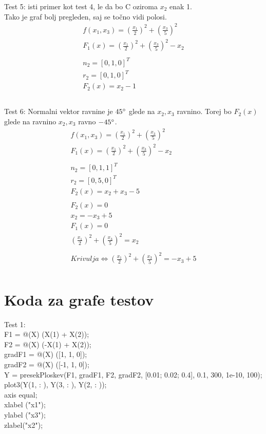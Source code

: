 \documentclass[12pt, letterpaper, twoside]{article}    %
\begin{document}
$$$$
$$$$

Test 5: isti primer kot test 4, le da bo C oziroma $x_2$ enak 1. \\
Tako je graf bolj pregleden, saj se točno vidi polosi.
\begin{equation}
\begin{split}
f(x_1, x_3) = (\frac{x_1}{2})^2 + (\frac{x_3}{5})^2 \\
F_1(x) = (\frac{x_1}{2})^2 + (\frac{x_3}{5})^2 - x_2 \\
\\
n_2 = [0, 1, 0]^T \\
r_2 = [0, 1, 0]^T \\
F_2(x) = x_2 - 1
\end{split}
\end{equation}

$$$$
$$$$

Test 6: Normalni vektor ravnine je $45\degree$ glede na $x_2, x_3$ ravnino.
Torej bo $F_2(x)$ glede na ravnino $x_2, x_3$ ravno $-45\degree$.
\begin{equation}
\begin{split}
f(x_1, x_3) = (\frac{x_1}{2})^2 + (\frac{x_3}{5})^2 \\
F_1(x) = (\frac{x_1}{2})^2 + (\frac{x_3}{5})^2 - x_2 \\
\\
n_2 = [0, 1, 1]^T \\
r_2 = [0, 5, 0]^T \\
F_2(x) = x_2 + x_3 - 5 \\
\\
F_2(x) = 0 \\
x_2 = - x_3 + 5 \\
F_1(x) = 0 \\
(\frac{x_1}{2})^2 + (\frac{x_3}{5})^2 = x_2 \\ 
\\
Krivulja \Leftrightarrow (\frac{x_1}{2})^2 + (\frac{x_3}{5})^2 = - x_3 + 5 \\
\end{split}
\end{equation}
$$$$

\newpage

\section{Koda za grafe testov}
Test 1: \\
F1 = @(X) (X(1) + X(2)); \\
F2 = @(X) (-X(1) + X(2)); \\
gradF1 = @(X) ([1, 1, 0]); \\
gradF2 = @(X) ([-1, 1, 0]); \\
Y = presekPloskev(F1, gradF1, F2, gradF2, [0.01; 0.02; 0.4], 0.1, 300, 1e-10, 100); \\
plot3(Y(1, : ), Y(3, : ), Y(2, : )); \\
axis equal; \\
xlabel ("x1"); \\
ylabel ("x3"); \\
zlabel("x2"); \\
\end{document}

